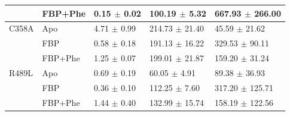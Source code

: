\begin{table}[!ht]
\begin{tabular}{@{}lllll@{}}
 & FBP+Phe & 0.15 $\pm$ 0.02 & 100.19 $\pm$ 5.32 & 667.93 $\pm$ 266.00 \\\midrule
C358A & Apo & 4.71 $\pm$ 0.99 & 214.73 $\pm$ 21.40 & 45.59 $\pm$ 21.62 \\
 & FBP & 0.58 $\pm$ 0.18 & 191.13 $\pm$ 16.22 & 329.53 $\pm$ 90.11 \\
 & FBP+Phe & 1.25 $\pm$ 0.07 & 199.01 $\pm$ 21.87 & 159.20 $\pm$ 31.24 \\\midrule
R489L & Apo & 0.69 $\pm$ 0.19 & 60.05 $\pm$ 4.91 & 89.38 $\pm$ 36.93 \\
 & FBP & 0.36 $\pm$ 0.10 & 112.25 $\pm$ 7.60 & 317.20 $\pm$ 125.71 \\
 & FBP+Phe & 1.44 $\pm$ 0.40 & 132.99 $\pm$ 15.74 & 158.19 $\pm$ 122.56 \\ \bottomrule
\end{tabular}
\label{tab:allohubmut_activity}
\end{table}

\clearpage


